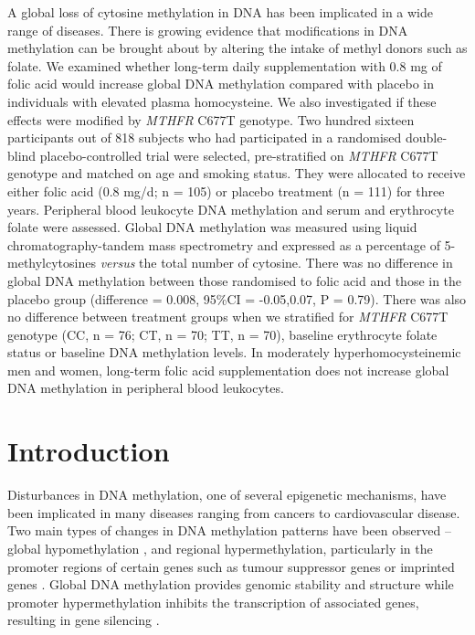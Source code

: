 \noindent A global loss of cytosine methylation in DNA has been implicated in a wide range of diseases. There is growing evidence that modifications in DNA methylation can be brought about by altering the intake of methyl donors such as folate. We examined whether long-term daily supplementation with 0.8 mg of folic acid would increase global DNA methylation compared with placebo in individuals with elevated plasma homocysteine. We also investigated if these effects were modified by \emph{MTHFR} C677T genotype. Two hundred sixteen participants out of 818 subjects who had participated in a randomised double-blind placebo-controlled trial were selected, pre-stratified on \emph{MTHFR} C677T genotype and matched on age and smoking status. They were allocated to receive either folic acid (0.8 mg/d; n = 105) or placebo treatment (n = 111) for three years. Peripheral blood leukocyte DNA methylation and serum and erythrocyte folate were assessed. Global DNA methylation was measured using liquid chromatography-tandem mass spectrometry and expressed as a percentage of 5-methylcytosines \emph{versus} the total number of cytosine. There was no difference in global DNA methylation between those randomised to folic acid and those in the placebo group (difference = 0.008, 95\%CI = -0.05,0.07, P = 0.79). There was also no difference between treatment groups when we stratified for \emph{MTHFR} C677T genotype (CC, n = 76; CT, n = 70; TT, n = 70), baseline erythrocyte folate status or baseline DNA methylation levels. In moderately hyperhomocysteinemic men and women, long-term folic acid supplementation does not increase global DNA methylation in peripheral blood leukocytes.

\newpage

\section[]{Introduction} %
\noindent Disturbances in DNA methylation, one of several epigenetic mechanisms, have been implicated in many diseases ranging from cancers to cardiovascular disease. Two main types of changes in DNA methylation patterns have been observed -- global hypomethylation \cite{c41}, and regional hypermethylation, particularly in the promoter regions of certain genes such as tumour suppressor genes or imprinted genes \cite{c42,c43,c44}. Global DNA methylation provides genomic stability and structure \cite{c45} while promoter hypermethylation inhibits the transcription of associated genes, resulting in gene silencing \cite{c46}.


